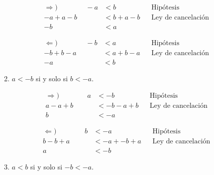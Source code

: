 \documentclass[11pt]{article}
\begin{document}
\begin{enumerate}[label=\alph*)]
\begin{enumerate}[label=\roman*)]
\begin{center}
\begin{minipage}[l]{.5\linewidth}
   \begin{align*}
    \Rightarrow) \qquad \qquad -a &< b && \text{Hipótesis}\\
    -a+a-b &< b +a-b && \text{Ley de cancelación}\\
    -b &< a%
   \end{align*}
  \end{minipage}%
  \begin{minipage}[r]{.5\linewidth}
   \begin{align*}
    \Leftarrow) \qquad \qquad   -b &< a && \text{Hipótesis}\\
    -b + b-a &< a + b-a && \text{Ley de cancelación}\\
    -a &< b%
   \end{align*}
  \end{minipage}
  \end{center}
  \item $a<-b$ si y solo si $b<-a$.
  \begin{center}\vspace{-1em}
  \begin{minipage}[l]{.5\linewidth}
   \begin{align*}
    \Rightarrow) \qquad \qquad
    a &< -b && \text{Hipótesis}\\
    a - a + b &< -b -a +b && \text{Ley de cancelación}\\
    b &< -a%
   \end{align*}
  \end{minipage}%
  \begin{minipage}[r]{.5\linewidth}
   \begin{align*}
    \Leftarrow) \qquad \qquad
    b &< -a && \text{Hipótesis}\\
    b -b +a &< -a + -b +a && \text{Ley de cancelación}\\
    a &< -b%
   \end{align*}
  \end{minipage}
  \end{center}
  \item $a<b$ si y solo si $-b<-a$.
  \begin{center}\vspace{-1em}

\end{center}
\end{enumerate}
\end{enumerate}
\end{document}
